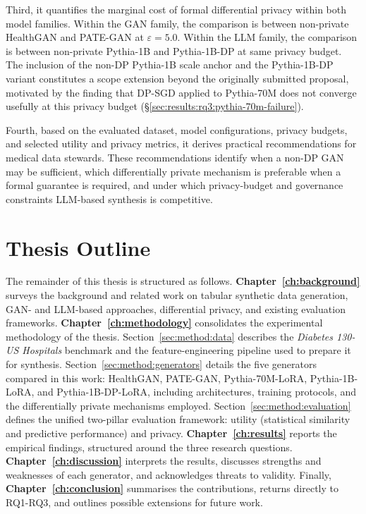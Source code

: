 Third, it quantifies the marginal cost of formal differential privacy within
both model families. Within the GAN family, the comparison is between non-private HealthGAN
and PATE-GAN at $\varepsilon=5.0$. Within the LLM family, the comparison
is between non-private Pythia-1B and Pythia-1B-DP at same privacy budget.
The inclusion of the non-DP Pythia-1B
scale anchor and the Pythia-1B-DP variant constitutes a scope extension beyond
the originally submitted proposal, motivated by the finding that DP-SGD applied
to Pythia-70M does not converge usefully at this privacy budget
(\S\ref{sec:results:rq3:pythia-70m-failure}).

Fourth, based on the evaluated dataset, model configurations, privacy budgets, 
and selected utility and privacy metrics, it derives practical recommendations 
for medical data stewards. These
recommendations identify when a non-DP GAN may be sufficient, which
differentially private mechanism is preferable when a formal guarantee is
required, and under which privacy-budget and governance constraints LLM-based
synthesis is competitive.

\section{Thesis Outline}
\label{sec:intro:outline}

The remainder of this thesis is structured as follows.
\textbf{Chapter~\ref{ch:background}} surveys the background and related work
on tabular synthetic data generation, GAN- and LLM-based approaches,
differential privacy, and existing evaluation frameworks.
\textbf{Chapter~\ref{ch:methodology}} consolidates the experimental
methodology of the thesis. Section~\ref{sec:method:data} describes the
\emph{Diabetes 130-US Hospitals} benchmark and the feature-engineering
pipeline used to prepare it for synthesis.
Section~\ref{sec:method:generators} details the five generators compared in
this work: HealthGAN, PATE-GAN, Pythia-70M-LoRA, Pythia-1B-LoRA, and
Pythia-1B-DP-LoRA, including architectures, training protocols, and the
differentially private mechanisms employed. Section~\ref{sec:method:evaluation} defines the unified
two-pillar evaluation framework: utility (statistical similarity and
predictive performance) and privacy.
\textbf{Chapter~\ref{ch:results}} reports the empirical findings, structured
around the three research questions.
\textbf{Chapter~\ref{ch:discussion}} interprets the results, discusses
strengths and weaknesses of each generator, and acknowledges threats to
validity. Finally, \textbf{Chapter~\ref{ch:conclusion}} summarises the
contributions, returns directly to RQ1-RQ3, and outlines possible extensions
for future work.

\cleardoublepage
